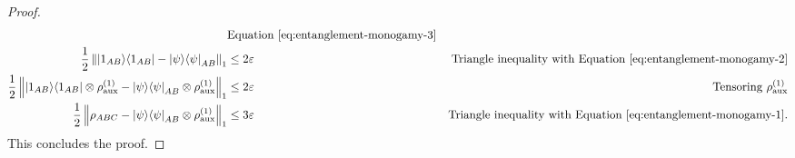 \begin{appendices}
\begin{proof}
\begin{align}
		& \text{Equation \eqref{eq:entanglement-monogamy-3}}
		\\
		\frac12\left\Vert\ket{1_{AB}}\!\bra{1_{AB}} - \ket{\psi}\!\bra{\psi}_{AB}\right\Vert_1
		&\leq 2\varepsilon
		& \text{Triangle inequality with Equation \eqref{eq:entanglement-monogamy-2}}
		\\
		\frac12 \left\Vert\ket{1_{AB}}\!\bra{1_{AB}}\otimes \rho^{(1)}_{\text{aux}} - \ket{\psi}\!\bra{\psi}_{AB}\otimes \rho^{(1)}_{\text{aux}}\right\Vert_1
		&\leq 2\varepsilon
		& \text{Tensoring }\rho^{(1)}_{\text{aux}}
		\\
		\frac12 \left\Vert\rho_{ABC} - \ket{\psi}\!\bra{\psi}_{AB}\otimes \rho^{(1)}_{\text{aux}}\right\Vert_1
		&\leq 3\varepsilon
		& \text{Triangle inequality with Equation \eqref{eq:entanglement-monogamy-1}}.
	\end{align}
This concludes the proof.
\end{proof}



\end{appendices}

